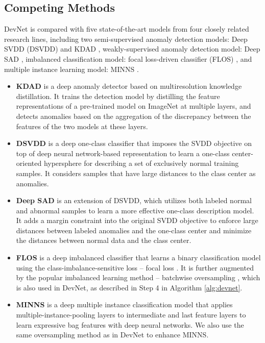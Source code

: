 \documentclass[10pt,journal,compsoc]{IEEEtran}
\begin{document}
\subsection{Competing Methods}\label{subsec:competing}

DevNet is compared with five state-of-the-art models from four closely related research lines, including two semi-supervised anomaly detection models: Deep SVDD (DSVDD) \cite{ruff2018deepsvdd} and KDAD \cite{salehi2021multiresolution}, weakly-supervised anomaly detection model: Deep SAD \cite{ruff2020deep}, imbalanced classification model: focal loss-driven classifier (FLOS) \cite{lin2017focalloss}, and multiple instance learning model: MINNS \cite{wang2018minns}.
\begin{itemize}
    \item \textbf{KDAD} is a deep anomaly detector based on multiresolution knowledge distillation. It trains the detection model by distilling the feature representations of a pre-trained model on ImageNet \cite{deng2009imagenet} at multiple layers, and detects anomalies based on the aggregation of the discrepancy between the features of the two models at these layers.
    \item \textbf{DSVDD} is a deep one-class classifier that imposes the SVDD objective \cite{tax2004svdd} on top of deep neural network-based representation to learn a one-class center-oriented hypersphere for describing a set of exclusively normal training samples. It considers samples that have large distances to the class center as anomalies.
    \item \textbf{Deep SAD} is an extension of DSVDD, which utilizes both labeled normal and abnormal samples to learn a more effective one-class description model. It adds a margin constraint into the original SVDD objective to enforce large distances between labeled anomalies and the one-class center and minimize the distances between normal data and the class center.
    \item \textbf{FLOS} is a deep imbalanced classifier that learns a binary classification model using the class-imbalance-sensitive loss -- focal loss \cite{lin2017focalloss}. It is further augmented by the popular imbalanced learning method -- batchwise oversampling \cite{he2009imbalance}, which is also used in DevNet, as described in Step 4 in Algorithm \ref{alg:devnet}.
    \item \textbf{MINNS} is a deep multiple instance classification model that applies multiple-instance-pooling layers \cite{wang2018revisiting} to intermediate and last feature layers to learn expressive bag features with deep neural networks. We also use the same oversampling method as in DevNet to enhance MINNS.
\end{itemize}
\end{document}
